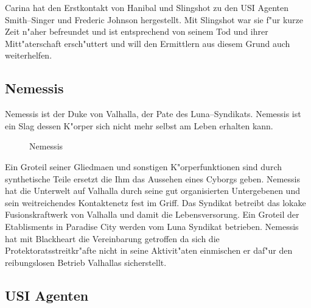 Carina hat den Erstkontakt von Hanibal und Slingshot zu den USI Agenten Smith--Singer und Frederic Johnson hergestellt. Mit Slingshot war sie f"ur kurze Zeit n"aher befreundet und ist entsprechend von seinem Tod und ihrer Mitt"aterschaft ersch"uttert und will den Ermittlern 
aus diesem Grund auch weiterhelfen.

\subsection{Nemessis}

Nemessis ist der Duke von Valhalla, der Pate des Luna--Syndikats. Nemessis ist ein Slag dessen K"orper sich nicht mehr selbst am Leben erhalten kann. 

\begin{figure}
    \caption{Nemessis}
\end{figure}

Ein Gro\3teil seiner Gliedma\3en und sonstigen K"orperfunktionen sind durch synthetische Teile ersetzt die Ihm das Aussehen eines Cyborgs geben. Nemessis hat die Unterwelt auf Valhalla durch seine gut organisierten Untergebenen und sein weitreichendes Kontaktenetz
fest im Griff. Das Syndikat betreibt das lokake Fusionskraftwerk von Valhalla und damit die Lebensversorung. Ein Gro\3teil der Etablisments in Paradise City werden vom Luna Syndikat betrieben. Nemessis hat mit Blackheart die Vereinbarung getroffen da\3 sich die Protektoratsstreitkr"afte nicht in seine Aktivit"aten einmischen er daf"ur den reibungslosen Betrieb Valhallas sicherstellt.


\newpage
\subsection{USI Agenten}

